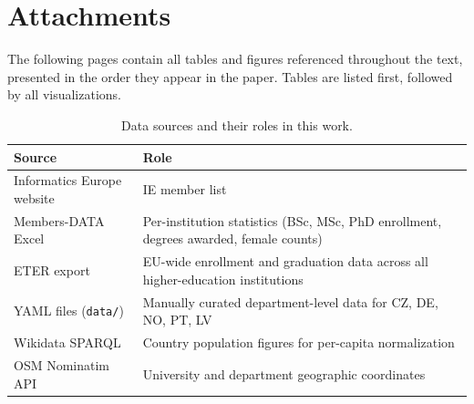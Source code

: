 \documentclass[final,3p,times,twocolumn]{elsarticle}
\begin{document}



\newpage
\section*{Attachments}

The following pages contain all tables and figures referenced throughout the text, presented in the order they appear in the paper. Tables are listed first, followed by all visualizations.

\begin{table}[htbp]
\caption{Data sources and their roles in this work.}
\label{tab:sources}
\begin{tabularx}{\textwidth}{lX}
\hline
\textbf{Source} & \textbf{Role} \\
\hline
Informatics Europe website & IE member list \\
Members-DATA Excel & Per-institution statistics (BSc, MSc, PhD enrollment, degrees awarded, female counts) \\
ETER export & EU-wide enrollment and graduation data across all higher-education institutions \\
YAML files (\texttt{data/}) & Manually curated department-level data for CZ, DE, NO, PT, LV \\
Wikidata SPARQL & Country population figures for per-capita normalization \\
OSM Nominatim API & University and department geographic coordinates \\
\hline
\end{tabularx}
\end{table}
\end{document}
